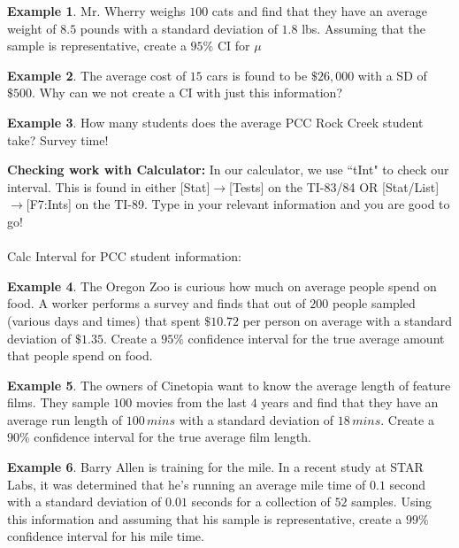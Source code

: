 \documentclass[12pt]{amsart}
\theoremstyle{definition}
\newtheorem{ex}{Example}
\begin{document}
\begin{ex} Mr. Wherry weighs $100$ cats and find that they have an average weight of $8.5$ pounds with a standard deviation of $1.8$ lbs. Assuming that the sample is representative, create a $95\%$ CI for $\mu$ \end{ex}
\vspace{1.5in}
\newpage

\begin{ex} The average cost of $15$ cars is found to be $\$26,000$ with a SD of $\$500$. Why can we not create a CI with just this information?\end{ex}
\vspace{1.5in}

\begin{ex} How many students does the average PCC Rock Creek student take? Survey time!\end{ex}
\vspace{3in}

\newpage
\noindent \textbf{Checking work with Calculator:} In our calculator, we use ``tInt" to check our interval. This is found in either [Stat]$\rightarrow$[Tests] on the TI-83/84 OR [Stat/List]$\rightarrow$[F7:Ints] on the TI-89. Type in your relevant information and you are good to go!\\
~\\
Calc Interval for PCC student information:

\begin{ex}
	The Oregon Zoo is curious how much on average people spend on food. A worker performs a survey and finds that out of $200$ people sampled (various days and times) that spent $\$10.72$ per person on average with a standard deviation of $\$1.35$. Create a $95\%$ confidence interval for the true average amount that people spend on food.
\end{ex}

\begin{ex}
	The owners of Cinetopia want to know the average length of feature films. They sample $100$ movies from the last $4$ years and find that they have an average run length of $100\,mins$ with a standard deviation of $18\,mins$. Create a $90\%$ confidence interval for the true average film length.
\end{ex}

\begin{ex}
	Barry Allen is training for the mile. In a recent study at STAR Labs, it was determined that he's running an average mile time of $0.1$ second with a standard deviation of $0.01$ seconds for a collection of $52$ samples. Using this information and assuming that his sample is representative, create a $99\%$ confidence interval for his mile time.
\end{ex}
\end{document}
